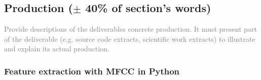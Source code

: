 \subsection{Production ($\pm$ 40\% of section's words)}
\textcolor{gray}{Provide descriptions of the deliverables concrete production.
It must present part of the deliverable (e.g. source code extracts, scientific
work extracts) to illustrate and explain its actual production.}

\subsubsection{Feature extraction with MFCC in Python}
